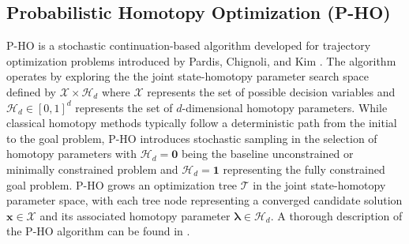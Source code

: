 \begin{algorithm}[H]
\caption{\texttt{rewire\_query}($x_{new}, \vec{x}_{near}$)}
\label{alg:rewire-query}

\end{algorithm}

\subsection{Probabilistic Homotopy Optimization (P-HO)}

\ac{P-HO} is a stochastic continuation-based algorithm developed for trajectory optimization problems introduced by Pardis, Chignoli, and Kim \cite{Pardis24}.
The algorithm operates by exploring the the joint state-homotopy parameter search space defined by $\mathcal{X} \times \mathcal{H}_d$ where $\mathcal{X}$ represents the set of possible decision variables and $\mathcal{H}_d \in [0,1]^d$ represents the set of $d$-dimensional homotopy parameters.
While classical homotopy methods typically follow a deterministic path from the initial to the goal problem, \ac{P-HO} introduces stochastic sampling in the selection of homotopy parameters with $\mathcal{H}_d = \mathbf{0}$ being the baseline unconstrained or minimally constrained problem and $\mathcal{H}_d = \mathbf{1}$ representing the fully constrained goal problem.
\ac{P-HO} grows an optimization tree $\mathcal{T}$ in the joint state-homotopy parameter space, with each tree node representing a converged candidate solution $\mathbf{x} \in \mathcal{X}$ and its associated homotopy parameter $\boldsymbol{\lambda} \in \mathcal{H}_d$.
A thorough description of the \ac{P-HO} algorithm can be found in \cite{Pardis24}.

